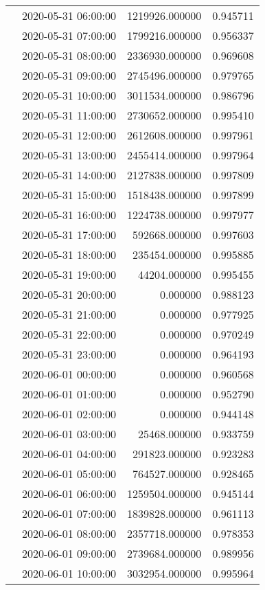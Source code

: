 \begin{tabular}{llrr}
 & 2020-05-31 06:00:00 & 1219926.000000 & 0.945711 \\
 & 2020-05-31 07:00:00 & 1799216.000000 & 0.956337 \\
 & 2020-05-31 08:00:00 & 2336930.000000 & 0.969608 \\
 & 2020-05-31 09:00:00 & 2745496.000000 & 0.979765 \\
 & 2020-05-31 10:00:00 & 3011534.000000 & 0.986796 \\
 & 2020-05-31 11:00:00 & 2730652.000000 & 0.995410 \\
 & 2020-05-31 12:00:00 & 2612608.000000 & 0.997961 \\
 & 2020-05-31 13:00:00 & 2455414.000000 & 0.997964 \\
 & 2020-05-31 14:00:00 & 2127838.000000 & 0.997809 \\
 & 2020-05-31 15:00:00 & 1518438.000000 & 0.997899 \\
 & 2020-05-31 16:00:00 & 1224738.000000 & 0.997977 \\
 & 2020-05-31 17:00:00 & 592668.000000 & 0.997603 \\
 & 2020-05-31 18:00:00 & 235454.000000 & 0.995885 \\
 & 2020-05-31 19:00:00 & 44204.000000 & 0.995455 \\
 & 2020-05-31 20:00:00 & 0.000000 & 0.988123 \\
 & 2020-05-31 21:00:00 & 0.000000 & 0.977925 \\
 & 2020-05-31 22:00:00 & 0.000000 & 0.970249 \\
 & 2020-05-31 23:00:00 & 0.000000 & 0.964193 \\
 & 2020-06-01 00:00:00 & 0.000000 & 0.960568 \\
 & 2020-06-01 01:00:00 & 0.000000 & 0.952790 \\
 & 2020-06-01 02:00:00 & 0.000000 & 0.944148 \\
 & 2020-06-01 03:00:00 & 25468.000000 & 0.933759 \\
 & 2020-06-01 04:00:00 & 291823.000000 & 0.923283 \\
 & 2020-06-01 05:00:00 & 764527.000000 & 0.928465 \\
 & 2020-06-01 06:00:00 & 1259504.000000 & 0.945144 \\
 & 2020-06-01 07:00:00 & 1839828.000000 & 0.961113 \\
 & 2020-06-01 08:00:00 & 2357718.000000 & 0.978353 \\
 & 2020-06-01 09:00:00 & 2739684.000000 & 0.989956 \\
 & 2020-06-01 10:00:00 & 3032954.000000 & 0.995964 \\

\end{tabular}
